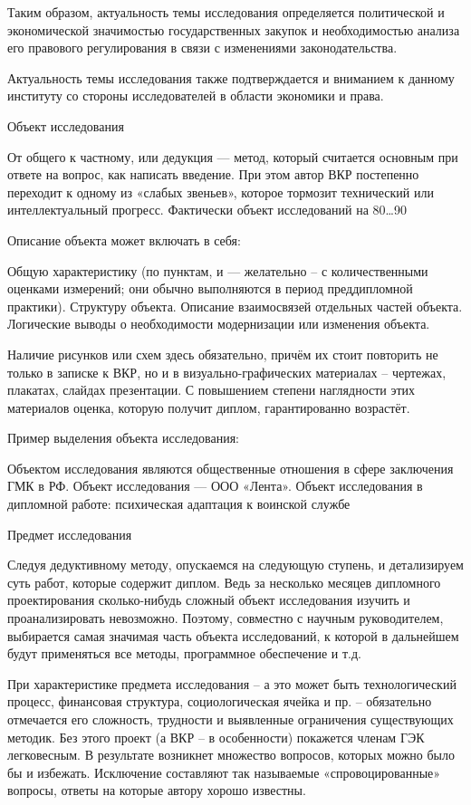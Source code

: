     Таким образом, актуальность темы исследования определяется политической и экономической значимостью государственных закупок и необходимостью анализа его правового регулирования в связи с изменениями законодательства.

    Актуальность темы исследования также подтверждается и вниманием к данному институту со стороны исследователей в области экономики и права.

Объект исследования

От общего к частному, или дедукция  — метод, который считается основным при ответе на вопрос, как написать введение.  При этом автор ВКР постепенно переходит к одному из «слабых звеньев», которое тормозит технический или интеллектуальный прогресс. Фактически объект исследований на 80…90%

Описание объекта может включать в себя:

    Общую характеристику (по пунктам, и — желательно – с количественными оценками измерений; они обычно выполняются в период преддипломной практики).
    Структуру объекта.
    Описание взаимосвязей отдельных частей объекта.
    Логические выводы о необходимости модернизации или изменения объекта.

Наличие рисунков или схем здесь обязательно, причём их стоит повторить не только в записке к ВКР, но и в визуально-графических материалах – чертежах, плакатах, слайдах презентации. С повышением степени наглядности этих материалов оценка, которую получит диплом, гарантированно возрастёт.

    Пример выделения объекта исследования:

        Объектом исследования являются общественные отношения в сфере заключения ГМК в РФ.
        Объект исследования — ООО «Лента».
        Объект исследования в дипломной работе: психическая адаптация к воинской службе

Предмет исследования

Следуя дедуктивному методу, опускаемся на следующую ступень, и детализируем суть работ, которые содержит диплом. Ведь за несколько месяцев дипломного проектирования сколько-нибудь сложный объект исследования изучить и проанализировать невозможно. Поэтому, совместно с научным руководителем, выбирается самая значимая часть объекта исследований, к которой в дальнейшем будут применяться все методы, программное обеспечение и т.д.

При характеристике предмета исследования – а это может быть технологический процесс, финансовая структура, социологическая ячейка и пр. – обязательно отмечается его сложность, трудности и выявленные ограничения существующих методик. Без этого проект (а ВКР – в особенности) покажется членам ГЭК легковесным. В результате возникнет множество вопросов, которых можно было бы и избежать. Исключение составляют так называемые «спровоцированные» вопросы,  ответы на которые автору хорошо известны.

